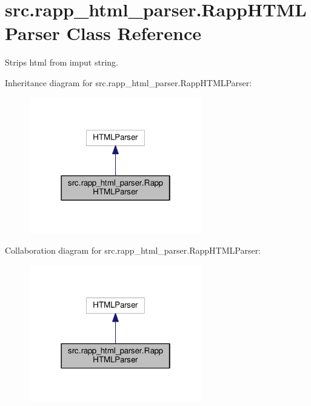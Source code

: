 \hypertarget{classsrc_1_1rapp__html__parser_1_1RappHTMLParser}{\section{src.\-rapp\-\_\-html\-\_\-parser.\-Rapp\-H\-T\-M\-L\-Parser Class Reference}
\label{classsrc_1_1rapp__html__parser_1_1RappHTMLParser}
}


Strips html from imput string.  




Inheritance diagram for src.\-rapp\-\_\-html\-\_\-parser.\-Rapp\-H\-T\-M\-L\-Parser\-:
\nopagebreak
\begin{figure}[H]
\begin{center}
\leavevmode
\includegraphics[width=214pt]{classsrc_1_1rapp__html__parser_1_1RappHTMLParser__inherit__graph}
\end{center}
\end{figure}


Collaboration diagram for src.\-rapp\-\_\-html\-\_\-parser.\-Rapp\-H\-T\-M\-L\-Parser\-:
\nopagebreak
\begin{figure}[H]
\begin{center}
\leavevmode
\includegraphics[width=214pt]{classsrc_1_1rapp__html__parser_1_1RappHTMLParser__coll__graph}
\end{center}
\end{figure}
